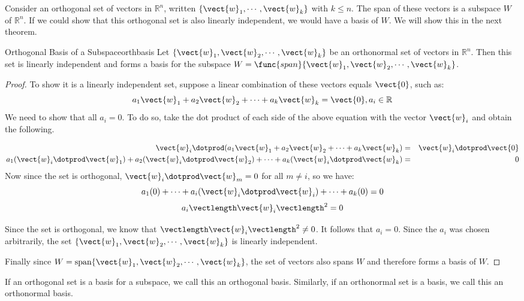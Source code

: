 Consider an orthogonal set of vectors in $\mathbb{R}^n$, written $\{
\vect{w}_1, \cdots, \vect{w}_k \}$ with $k \leq n$. The span of these
vectors is a subspace $W$ of $\mathbb{R}^n$. If we
could show that this orthogonal set is also linearly independent, we
would have a basis of $W$. We will show this in the next theorem.

\begin{theorem}{Orthogonal Basis of a Subspace}{orthbasis}
Let $ \{ \vect{w}_1, \vect{w}_2, \cdots, \vect{w}_k \}$ be an
orthonormal set of vectors in $\mathbb{R}^n$. Then this set is
linearly independent and forms a basis for the subspace $W =
\func{span} \{ \vect{w}_1, \vect{w}_2, \cdots, \vect{w}_k \}$.
\end{theorem}

\begin{proof}
To show it is a linearly independent set, suppose a linear combination
of these vectors equals $\vect{0}$, such as:
\[
a_1 \vect{w}_1 + a_2 \vect{w}_2 + \cdots + a_k \vect{w}_k = \vect{0}, a_i \in \mathbb{R} 
\]
We need to show that all $a_i = 0$. To do so, take the dot product of
each side of the above equation with the vector $\vect{w}_i$ and obtain the following. 

\begin{eqnarray*}
\vect{w}_i \dotprod (a_1 \vect{w}_1 + a_2 \vect{w}_2 + \cdots + a_k \vect{w}_k ) &=& \vect{w}_i \dotprod \vect{0}\\
a_1 (\vect{w}_i \dotprod \vect{w}_1) + a_2 (\vect{w}_i \dotprod \vect{w}_2) + \cdots + a_k (\vect{w}_i \dotprod \vect{w}_k)  &=& 0 
\end{eqnarray*}
Now since the set is orthogonal, $\vect{w}_i \dotprod \vect{w}_m = 0$ for all $m \neq i$, so we have:
\[
a_1 (0) + \cdots + a_i(\vect{w}_i \dotprod \vect{w}_i) + \cdots + a_k (0) = 0
\]
\[
a_i \vectlength \vect{w}_i \vectlength^2 = 0
\]

Since the set is orthogonal, we know that $\vectlength \vect{w}_i \vectlength^2  \neq 0$. It follows that $a_i =0$. Since the $a_i$ was chosen arbitrarily, the set $\{ \vect{w}_1, \vect{w}_2, \cdots, \vect{w}_k \}$ is linearly independent. 

Finally since $W = \mbox{span} \{ \vect{w}_1, \vect{w}_2, \cdots,
\vect{w}_k \}$, the set of vectors also spans $W$ and therefore forms a basis of $W$. 

\end{proof}

If an orthogonal set is a basis for a subspace, we call this an
orthogonal basis. Similarly, if an orthonormal set is a basis, we call
this an orthonormal basis.

